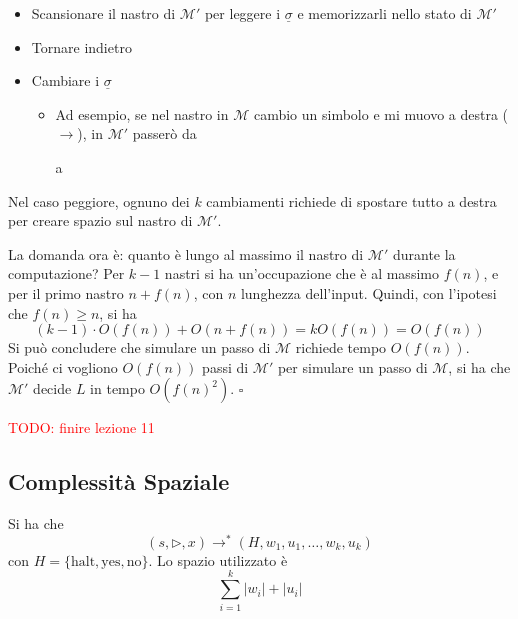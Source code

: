 \begin{itemize}
    \item Scansionare il nastro di $\mathcal{M}'$ per leggere i $\underline{\sigma}$ e memorizzarli nello stato di $\mathcal{M}'$
    \item Tornare indietro
    \item Cambiare i $\underline{\sigma}$
    \begin{itemize}
        \item Ad esempio, se nel nastro in $\mathcal{M}$ cambio un simbolo e mi muovo a destra ($\to$), in $\mathcal{M}'$ passerò da 
        a 
    \end{itemize}
\end{itemize} 
Nel caso peggiore, ognuno dei $k$ cambiamenti richiede di spostare tutto a destra per creare spazio sul nastro di $\mathcal{M}'$. 

La domanda ora è: quanto è lungo al massimo il nastro di $\mathcal{M}'$ durante la computazione? Per $k-1$ nastri si ha un'occupazione che è al massimo $f(n)$, e per il primo nastro $n+f(n)$, con $n$ lunghezza dell'input. Quindi, con l'ipotesi che $f(n)\geq n$, si ha 
$$
(k-1)\cdot O(f(n)) + O(n+f(n)) = kO(f(n)) = O(f(n))
$$
Si può concludere che simulare un passo di $\mathcal{M}$ richiede tempo $O(f(n))$. Poiché ci vogliono $O(f(n))$ passi di $\mathcal{M}'$ per simulare un passo di $\mathcal{M}$, si ha che $\mathcal{M}'$ decide $L$ in tempo $O(f(n)^2)$. \hfill $\square$



\textcolor{Red}{TODO: finire lezione 11}


\subsection{Complessità Spaziale}
\begin{definition}
    Si ha che
    $$
        (s,\rhd,x) \to^* (H,w_1,u_1,\dots,w_k,u_k)
    $$
    con $H=\{\text{halt},\text{yes},\text{no}\}$. Lo spazio utilizzato è
    $$
        \sum_{i=1}^k |w_i| + |u_i|
    $$
\end{definition}

